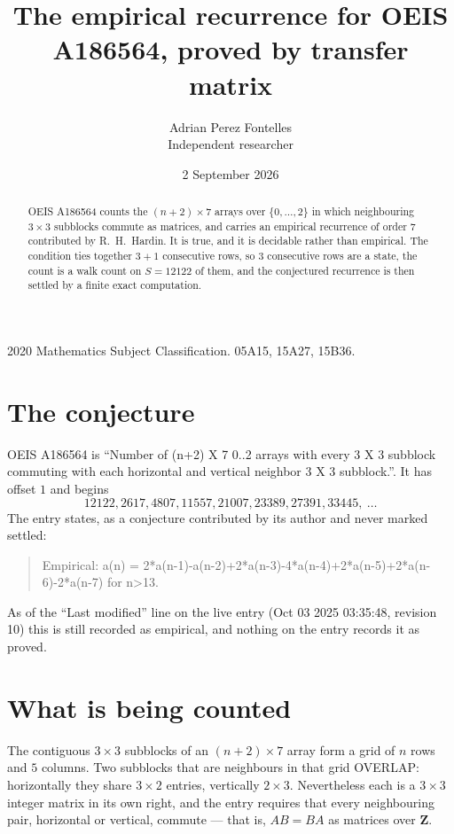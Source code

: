 \documentclass[11pt,a4paper]{article}
\title{The empirical recurrence for OEIS A186564, proved by transfer matrix}
\author{Adrian Perez Fontelles\\ \small Independent researcher}
\date{2 September 2026}
\theoremstyle{plain}
\theoremstyle{definition}
\begin{document}
\maketitle

\begin{abstract}
OEIS A186564 counts the $(n+2)\times7$ arrays over $\{0,\dots,2\}$ in which
neighbouring $3\times3$ subblocks commute as matrices, and carries an empirical
recurrence
of order $7$ contributed by R.~H.~Hardin. It is true, and it is decidable rather than
empirical. The condition ties together $3+1$ consecutive rows, so $3$ consecutive rows are
a state, the count is a walk count on $S=12122$ of them, and the conjectured recurrence is then
settled by a finite exact computation.
\end{abstract}

\noindent\small 2020 Mathematics Subject Classification. 05A15, 15A27, 15B36.\normalsize

\section{The conjecture}

OEIS A186564 is ``Number of (n+2) X 7 0..2 arrays with every 3 X 3 subblock commuting with each horizontal and vertical neighbor 3 X 3 subblock.''. It has offset $1$ and begins
\[
12122, 2617, 4807, 11557, 21007, 23389, 27391, 33445,\ \dots
\]
The entry states, as a conjecture contributed by its author and never marked settled:
\begin{quote}
Empirical: a(n) = 2*a(n-1)-a(n-2)+2*a(n-3)-4*a(n-4)+2*a(n-5)+2*a(n-6)-2*a(n-7) for n>13.
\end{quote}
As of the ``Last modified'' line on the live entry (Oct 03 2025 03:35:48, revision 10) this is still
recorded as empirical, and nothing on the entry records it as proved.

\section{What is being counted}

The contiguous $3\times3$ subblocks of an $(n+2)\times7$ array form a grid of $n$
rows and $5$ columns. Two subblocks that are neighbours in that
grid OVERLAP: horizontally they share $3\times2$ entries, vertically
$2\times3$. Nevertheless each is a $3\times3$ integer matrix in its own right, and
the entry requires that every neighbouring pair, horizontal or vertical, commute --- that is,
$AB=BA$ as matrices over $\mathbf{Z}$.
\end{document}
